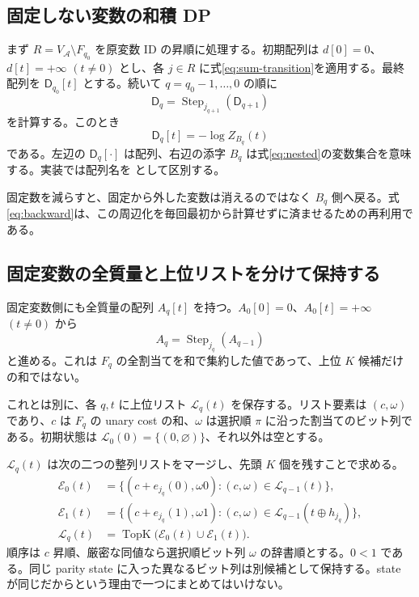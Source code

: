 \documentclass[a4paper,11pt]{ltjsarticle}
\numberwithin{equation}{section}
\theoremstyle{definition}
\newcommand{\A}{\mathcal A}
\newcommand{\TopK}{\operatorname{TopK}}
\newcommand{\code}[1]{\texttt{\detokenize{#1}}}
\newcommand{\ninf}{+\infty}
\begin{document}
\subsection{固定しない変数の和積 DP}
まず $R=V_\A\setminus F_{q_0}$ を原変数 ID の昇順に処理する。初期配列は $d[0]=0$、$d[t]=\ninf$ $(t\ne0)$ とし、各 $j\in R$ に式\eqref{eq:sum-transition}を適用する。最終配列を $\mathsf D_{q_0}[t]$ とする。続いて $q=q_0-1,\ldots,0$ の順に
\begin{equation}
 \mathsf D_q=\operatorname{Step}_{j_{q+1}}(\mathsf D_{q+1})
 \label{eq:backward}
\end{equation}
を計算する。このとき
\begin{equation}
 \mathsf D_q[t]=-\log Z_{B_q}(t)
 \label{eq:backward-meaning}
\end{equation}
である。左辺の $\mathsf D_q[\cdot]$ は配列、右辺の添字 $B_q$ は式\eqref{eq:nested}の変数集合を意味する。実装では配列名を \code{suffix_cost[q][t]} として区別する。

固定数を減らすと、固定から外した変数は消えるのではなく $B_q$ 側へ戻る。式\eqref{eq:backward}は、この周辺化を毎回最初から計算せずに済ませるための再利用である。

\subsection{固定変数の全質量と上位リストを分けて保持する}
固定変数側にも全質量の配列 $A_q[t]$ を持つ。$A_0[0]=0$、$A_0[t]=\ninf$ $(t\ne0)$ から
\begin{equation}
 A_q=\operatorname{Step}_{j_q}(A_{q-1})
 \label{eq:forward}
\end{equation}
と進める。これは $F_q$ の全割当てを和で集約した値であって、上位 $K$ 候補だけの和ではない。

これとは別に、各 $q,t$ に上位リスト $\mathcal L_q(t)$ を保存する。リスト要素は $(c,\omega)$ であり、$c$ は $F_q$ の unary cost の和、$\omega$ は選択順 $\pi$ に沿った割当てのビット列である。初期状態は $\mathcal L_0(0)=\{(0,\varnothing)\}$、それ以外は空とする。

$\mathcal L_q(t)$ は次の二つの整列リストをマージし、先頭 $K$ 個を残すことで求める。
\begin{align}
 \mathcal E_0(t)&=
 \{(c+e_{j_q}(0),\omega0):(c,\omega)\in\mathcal L_{q-1}(t)\},
 \label{eq:extend-zero}\\
 \mathcal E_1(t)&=
 \{(c+e_{j_q}(1),\omega1):(c,\omega)\in\mathcal L_{q-1}(t\oplus h_{j_q})\},
 \label{eq:extend-one}\\
 \mathcal L_q(t)&=\TopK\bigl(\mathcal E_0(t)\cup\mathcal E_1(t)\bigr).
 \label{eq:list-dp}
\end{align}
順序は $c$ 昇順、厳密な同値なら選択順ビット列 $\omega$ の辞書順とする。$0<1$ である。同じ parity state に入った異なるビット列は別候補として保持する。state が同じだからという理由で一つにまとめてはいけない。
\end{document}
